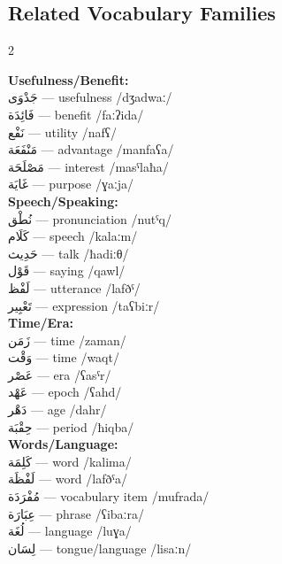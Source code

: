 \documentclass[letterpaper,12pt]{article}
\begin{document}
\subsection{Related Vocabulary Families}

\begin{multicols}{2}

\textbf{Usefulness/Benefit:}\\
\textarabic{جَدْوَى} — usefulness /dʒadwaː/\\
\textarabic{فَائِدَة} — benefit /faːʔida/\\
\textarabic{نَفْع} — utility /nafʕ/\\
\textarabic{مَنْفَعَة} — advantage /manfaʕa/\\
\textarabic{مَصْلَحَة} — interest /masˤlaħa/\\
\textarabic{غَايَة} — purpose /ɣaːja/\\

\textbf{Speech/Speaking:}\\
\textarabic{نُطْق} — pronunciation /nutˤq/\\
\textarabic{كَلَام} — speech /kalaːm/\\
\textarabic{حَدِيث} — talk /ħadiːθ/\\
\textarabic{قَوْل} — saying /qawl/\\
\textarabic{لَفْظ} — utterance /lafðˤ/\\
\textarabic{تَعْبِير} — expression /taʕbiːr/\\

\textbf{Time/Era:}\\
\textarabic{زَمَن} — time /zaman/\\
\textarabic{وَقْت} — time /waqt/\\
\textarabic{عَصْر} — era /ʕasˤr/\\
\textarabic{عَهْد} — epoch /ʕahd/\\
\textarabic{دَهْر} — age /dahr/\\
\textarabic{حِقْبَة} — period /ħiqba/\\

\textbf{Words/Language:}\\
\textarabic{كَلِمَة} — word /kalima/\\
\textarabic{لَفْظَة} — word /lafðˤa/\\
\textarabic{مُفْرَدَة} — vocabulary item /mufrada/\\
\textarabic{عِبَارَة} — phrase /ʕibaːra/\\
\textarabic{لُغَة} — language /luɣa/\\
\textarabic{لِسَان} — tongue/language /lisaːn/\\


\end{multicols}
\end{document}
